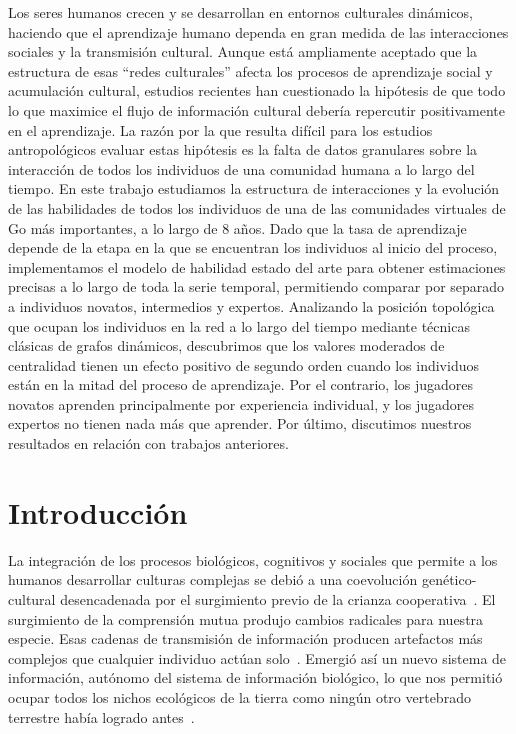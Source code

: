 \documentclass[a4paper,11pt]{book}
\theoremstyle{definition}
\begin{document}
Los seres humanos crecen y se desarrollan en entornos culturales din\'amicos, haciendo que el aprendizaje humano dependa en gran medida de las interacciones sociales y la transmisi\'on cultural.
%
Aunque est\'a ampliamente aceptado que la estructura de esas ``redes culturales'' afecta los procesos de aprendizaje social y acumulaci\'on cultural, estudios recientes han cuestionado la hip\'otesis de que todo lo que maximice el flujo de informaci\'on cultural deber\'ia repercutir positivamente en el aprendizaje.
%
La raz\'on por la que resulta dif\'icil para los estudios antropol\'ogicos evaluar estas hip\'otesis es la falta de datos granulares sobre la interacci\'on de todos los individuos de una comunidad humana a lo largo del tiempo.
%
En este trabajo estudiamos la estructura de interacciones y la evoluci\'on de las habilidades de todos los individuos de una de las comunidades virtuales de Go m\'as importantes, a lo largo de 8 a\~nos.
%
Dado que la tasa de aprendizaje depende de la etapa en la que se encuentran los individuos al inicio del proceso, implementamos el modelo de habilidad estado del arte para obtener estimaciones precisas a lo largo de toda la serie temporal, permitiendo comparar por separado a individuos novatos, intermedios y expertos.
%
Analizando la posici\'on topol\'ogica que ocupan los individuos en la red a lo largo del tiempo mediante t\'ecnicas cl\'asicas de grafos din\'amicos, descubrimos que los valores moderados de centralidad tienen un efecto positivo de segundo orden cuando los individuos est\'an en la mitad del proceso de aprendizaje.
%
Por el contrario, los jugadores novatos aprenden principalmente por experiencia individual, y los jugadores expertos no tienen nada m\'as que aprender.
%
Por \'ultimo, discutimos nuestros resultados en relaci\'on con trabajos anteriores.

\section{Introducci\'on}

La integraci\'on de los procesos biol\'ogicos, cognitivos y sociales que permite a los humanos desarrollar culturas complejas se debi\'o a una coevoluci\'on gen\'etico-cultural desencadenada por el surgimiento previo de la crianza cooperativa~\cite{Hrdy2020, Koster2020}.
%
El surgimiento de la comprensi\'on mutua produjo cambios radicales para nuestra especie.
%
Esas cadenas de transmisi\'on de informaci\'on producen artefactos m\'as complejos que cualquier individuo act\'uan solo~\cite{Derex2015}.
%
Emergi\'o as\'i un nuevo sistema de informaci\'on, aut\'onomo del sistema de informaci\'on biol\'ogico, lo que nos permiti\'o ocupar todos los nichos ecol\'ogicos de la tierra como ning\'un otro vertebrado terrestre hab\'ia logrado antes~\cite{Boyd2011}.
\end{document}

